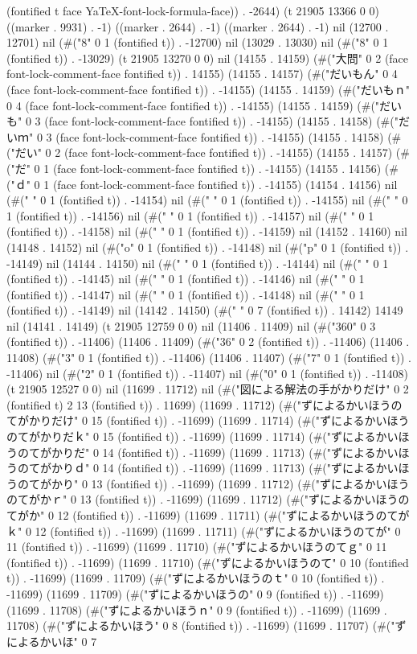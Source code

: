 (fontified t face YaTeX-font-lock-formula-face)) . -2644) (t 21905 13366 0 0) ((marker . 9931) . -1) ((marker . 2644) . -1) ((marker . 2644) . -1) nil (12700 . 12701) nil (#("8" 0 1 (fontified t)) . -12700) nil (13029 . 13030) nil (#("8" 0 1 (fontified t)) . -13029) (t 21905 13270 0 0) nil (14155 . 14159) (#("大問" 0 2 (face font-lock-comment-face fontified t)) . 14155) (14155 . 14157) (#("だいもん" 0 4 (face font-lock-comment-face fontified t)) . -14155) (14155 . 14159) (#("だいもｎ" 0 4 (face font-lock-comment-face fontified t)) . -14155) (14155 . 14159) (#("だいも" 0 3 (face font-lock-comment-face fontified t)) . -14155) (14155 . 14158) (#("だいｍ" 0 3 (face font-lock-comment-face fontified t)) . -14155) (14155 . 14158) (#("だい" 0 2 (face font-lock-comment-face fontified t)) . -14155) (14155 . 14157) (#("だ" 0 1 (face font-lock-comment-face fontified t)) . -14155) (14155 . 14156) (#("ｄ" 0 1 (face font-lock-comment-face fontified t)) . -14155) (14154 . 14156) nil (#(" " 0 1 (fontified t)) . -14154) nil (#(" " 0 1 (fontified t)) . -14155) nil (#(" " 0 1 (fontified t)) . -14156) nil (#(" " 0 1 (fontified t)) . -14157) nil (#(" " 0 1 (fontified t)) . -14158) nil (#(" " 0 1 (fontified t)) . -14159) nil (14152 . 14160) nil (14148 . 14152) nil (#("o" 0 1 (fontified t)) . -14148) nil (#("p" 0 1 (fontified t)) . -14149) nil (14144 . 14150) nil (#(" " 0 1 (fontified t)) . -14144) nil (#(" " 0 1 (fontified t)) . -14145) nil (#(" " 0 1 (fontified t)) . -14146) nil (#(" " 0 1 (fontified t)) . -14147) nil (#(" " 0 1 (fontified t)) . -14148) nil (#(" " 0 1 (fontified t)) . -14149) nil (14142 . 14150) (#("       " 0 7 (fontified t)) . 14142) 14149 nil (14141 . 14149) (t 21905 12759 0 0) nil (11406 . 11409) nil (#("360" 0 3 (fontified t)) . -11406) (11406 . 11409) (#("36" 0 2 (fontified t)) . -11406) (11406 . 11408) (#("3" 0 1 (fontified t)) . -11406) (11406 . 11407) (#("7" 0 1 (fontified t)) . -11406) nil (#("2" 0 1 (fontified t)) . -11407) nil (#("0" 0 1 (fontified t)) . -11408) (t 21905 12527 0 0) nil (11699 . 11712) nil (#("図による解法の手がかりだけ" 0 2 (fontified t) 2 13 (fontified t)) . 11699) (11699 . 11712) (#("ずによるかいほうのてがかりだけ" 0 15 (fontified t)) . -11699) (11699 . 11714) (#("ずによるかいほうのてがかりだｋ" 0 15 (fontified t)) . -11699) (11699 . 11714) (#("ずによるかいほうのてがかりだ" 0 14 (fontified t)) . -11699) (11699 . 11713) (#("ずによるかいほうのてがかりｄ" 0 14 (fontified t)) . -11699) (11699 . 11713) (#("ずによるかいほうのてがかり" 0 13 (fontified t)) . -11699) (11699 . 11712) (#("ずによるかいほうのてがかｒ" 0 13 (fontified t)) . -11699) (11699 . 11712) (#("ずによるかいほうのてがか" 0 12 (fontified t)) . -11699) (11699 . 11711) (#("ずによるかいほうのてがｋ" 0 12 (fontified t)) . -11699) (11699 . 11711) (#("ずによるかいほうのてが" 0 11 (fontified t)) . -11699) (11699 . 11710) (#("ずによるかいほうのてｇ" 0 11 (fontified t)) . -11699) (11699 . 11710) (#("ずによるかいほうのて" 0 10 (fontified t)) . -11699) (11699 . 11709) (#("ずによるかいほうのｔ" 0 10 (fontified t)) . -11699) (11699 . 11709) (#("ずによるかいほうの" 0 9 (fontified t)) . -11699) (11699 . 11708) (#("ずによるかいほうｎ" 0 9 (fontified t)) . -11699) (11699 . 11708) (#("ずによるかいほう" 0 8 (fontified t)) . -11699) (11699 . 11707) (#("ずによるかいほ" 0 7 